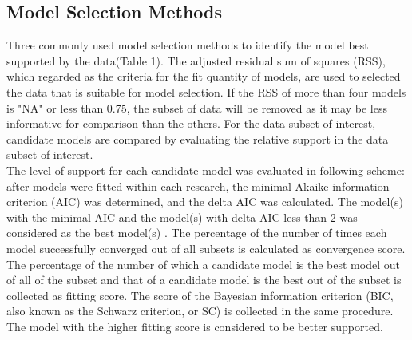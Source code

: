 \documentclass[a4paper,11pt]{article}
\theoremstyle{definition}
\begin{document}
\subsection{Model Selection Methods}
Three commonly used model selection methods to identify the model best supported by the data(Table 1). The adjusted residual sum of squares (RSS), which regarded as the criteria for the fit quantity of models, are used to selected the data that is suitable for model selection. If the RSS of more than four models is "NA" or less than 0.75, the subset of data will be removed as it may be less informative for comparison than the others. For the data subset of interest, candidate models are compared by evaluating the relative support in the data subset of interest.\\
The level of support for each candidate model was evaluated in following scheme: after models were fitted within each research, the minimal Akaike information criterion (AIC) was determined, and the delta AIC was calculated. The model(s) with the minimal AIC and the model(s) with delta AIC less than 2 was considered as the best model(s) \citep{burnham2004multimodel}. The percentage of the number of times each model successfully converged out of all subsets is calculated as convergence score. The percentage of the number of which a candidate model is the best model out of all of the subset and that of a candidate model is the best out of the subset is collected as fitting score. The score of the Bayesian information criterion (BIC, also known as the Schwarz criterion, or SC) is collected in the same procedure. The model with the higher fitting score is considered to be better supported.\\
\end{document}
